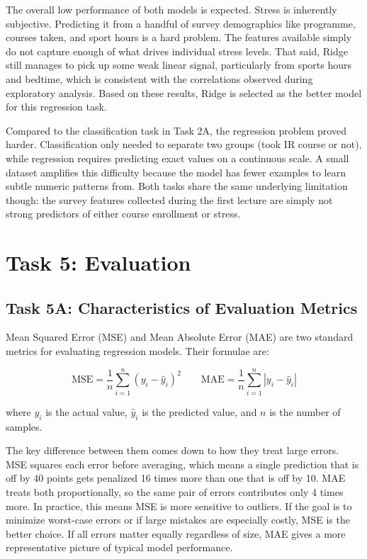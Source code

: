 \documentclass[runningheads]{llncs}
\begin{document}
The overall low performance of both models is expected. Stress is inherently subjective. Predicting it from a handful of survey demographics like programme, courses taken, and sport hours is a hard problem. The features available simply do not capture enough of what drives individual stress levels. That said, Ridge still manages to pick up some weak linear signal, particularly from sports hours and bedtime, which is consistent with the correlations observed during exploratory analysis. Based on these results, Ridge is selected as the better model for this regression task.

Compared to the classification task in Task 2A, the regression problem proved harder. Classification only needed to separate two groups (took IR course or not), while regression requires predicting exact values on a continuous scale. A small dataset amplifies this difficulty because the model has fewer examples to learn subtle numeric patterns from. Both tasks share the same underlying limitation though: the survey features collected during the first lecture are simply not strong predictors of either course enrollment or stress.




\section{Task 5: Evaluation}

\subsection*{Task 5A: Characteristics of Evaluation Metrics}

Mean Squared Error (MSE) and Mean Absolute Error (MAE) are two standard metrics for evaluating regression models. Their formulae are:

\[
\text{MSE} = \frac{1}{n} \sum_{i=1}^{n} (y_i - \hat{y}_i)^2
\qquad \text{MAE} = \frac{1}{n} \sum_{i=1}^{n} |y_i - \hat{y}_i|
\]

where $y_i$ is the actual value, $\hat{y}_i$ is the predicted value, and $n$ is the number of samples.

The key difference between them comes down to how they treat large errors. MSE squares each error before averaging, which means a single prediction that is off by 40 points gets penalized 16 times more than one that is off by 10. MAE treats both proportionally, so the same pair of errors contributes only 4 times more. In practice, this means MSE is more sensitive to outliers. If the goal is to minimize worst-case errors or if large mistakes are especially costly, MSE is the better choice. If all errors matter equally regardless of size, MAE gives a more representative picture of typical model performance.
\end{document}
